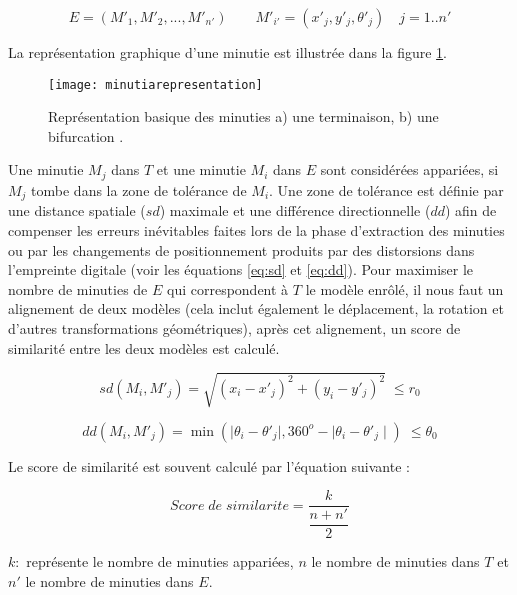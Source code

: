 \begin{center}
	\begin{equation}\label{eq:e}
	E=(M\prime_{1},M\prime_{2}, ..., M\prime_{n\prime})\qquad M\prime _{i\prime }=(x\prime _{j },y\prime_{j},\theta\prime_{j}) \quad j = 1 .. n\prime
	\end{equation}
\end{center}
\clearpage
La représentation graphique d'une minutie est illustrée dans la figure \ref{fig:chapitre2minutiarepresentation}.
\begin{center}
	\begin{figure}[H]
		\centering
		\texttt{[image: minutiarepresentation]}
		\captionsetup{justification=centering}
		\caption{Représentation basique des minuties a) une terminaison, b) une bifurcation \citep{maltoni2009handbook}.}
		\label{fig:chapitre2minutiarepresentation}
	\end{figure}
\end{center}
Une minutie $ M_{j} $ dans $ T $ et une minutie $ M_{i} $ dans $ E $ sont considérées appariées, si $ M_{j} $ tombe dans la zone de tolérance de $ M_{i} $. Une zone de tolérance est définie par une distance spatiale ($ sd $) maximale et une différence directionnelle ($ dd $) afin de compenser les erreurs inévitables faites lors de la phase d'extraction des minuties ou par les changements de positionnement produits par des distorsions dans l'empreinte digitale (voir les équations \ref{eq:sd} et \ref{eq:dd}). Pour maximiser le nombre de minuties de $ E $ qui correspondent à $ T $ le modèle enrôlé, il nous faut un alignement de deux modèles (cela inclut également le déplacement, la rotation et d'autres transformations géométriques), après cet alignement, un score de similarité entre les deux modèles est calculé.

\begin{center}
	\begin{equation}	
	\label{eq:sd}	
	sd(M_{i},M\prime_{j})=\sqrt{(x_{i}-x\prime _{j})^{2}+(y_{i}-y\prime _{j})^{2}} \; \leq r_{0}
	\end{equation}
\end{center}
\begin{center}
	\begin{equation}\label{eq:dd}	
	dd(M_{i},M'_{j})=\min(\mid\theta_{i}-\theta \prime _{j}\mid, 360^{o} - \mid\theta_{i}-\theta \prime _{j}\mid) \; \leq \theta_{0}
	\end{equation}
\end{center}
Le score de similarité est souvent calculé par l'équation suivante \citep{maltoni2009handbook} :
\begin{center}
	\begin{equation}\label{eq:ss}	
	Score\;de\; similarite=\dfrac{k}{\dfrac{n+n \prime}{2}}
	\end{equation}
\end{center}
\textbf{$ k : $} représente le nombre de minuties appariées, $ n $ le nombre de minuties dans $ T $ et $ n \prime $ le nombre de minuties dans $ E $. 

